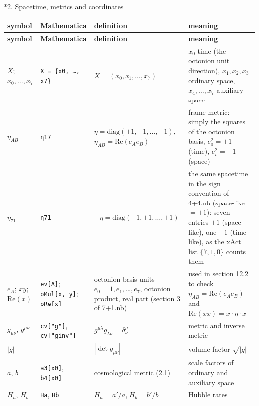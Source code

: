 \documentclass[10pt,a4paper]{article}
\makeatletter
\renewcommand\section{\@startsection{section}{1}{\z@}{-3.5ex \@plus -1ex \@minus -.2ex}{2.3ex \@plus.2ex}{\normalfont\Large\bfseries\raggedright}}
\makeatother
\begin{document}
\section*{2. Spacetime, metrics and coordinates}
{\small
\begin{longtable}{>{\raggedright\arraybackslash}p{}>{\raggedright\arraybackslash}p{}>{\raggedright\arraybackslash}p{}>{\raggedright\arraybackslash}p{}}
\toprule
\textbf{symbol} & \textbf{Mathematica} & \textbf{definition} & \textbf{meaning} \\
\midrule\endfirsthead
\toprule
\textbf{symbol} & \textbf{Mathematica} & \textbf{definition} & \textbf{meaning} \\
\midrule\endhead
\endfoot
\bottomrule\endlastfoot
$X$; $x_0,\dots,x_7$ & \texttt{X = \{x0, …, x7\}} & $X=(x_0,x_1,\dots,x_7)$ & $x_0$ time (the octonion unit direction), $x_1,x_2,x_3$ ordinary space, $x_4,\dots,x_7$ auxiliary space \\
$\eta_{AB}$ & \texttt{η17} & $\eta=\mathrm{diag}(+1,-1,\dots,-1)$, $\eta_{AB}=\mathrm{Re}(e_Ae_B)$ & frame metric: simply the squares of the octonion basis, $e_0^2=+1$ (time), $e_i^2=-1$ (space) \\
$\eta_{71}$ & \texttt{η71} & $-\eta=\mathrm{diag}(-1,+1,\dots,+1)$ & the same spacetime in the sign convention of 4+4.nb (space-like $=+1$): seven entries $+1$ (space-like), one $-1$ (time-like), as the xAct list $\{7,1,0\}$ counts them \\
$e_A$; $xy$; $\mathrm{Re}(x)$ & \texttt{ev[A]}; \texttt{oMul[x, y]}; \texttt{oRe[x]} & octonion basis units $e_0=1,e_1,\dots,e_7$, octonion product, real part (section 3 of 7+1.nb) & used in section 12.2 to check $\eta_{AB}=\mathrm{Re}(e_Ae_B)$ and $\mathrm{Re}(xx)=x\cdot\eta\cdot x$ \\
$g_{\mu\nu}$, $g^{\mu\nu}$ & \texttt{cv["g"]}, \texttt{cv["ginv"]} & $g^{\mu\lambda}g_{\lambda\nu}=\delta^\mu_\nu$ & metric and inverse metric \\
$|g|$ & — & $|\det g_{\mu\nu}|$ & volume factor $\sqrt{|g|}$ \\
$a$, $b$ & \texttt{a3[x0]}, \texttt{b4[x0]} & cosmological metric (2.1) & scale factors of ordinary and auxiliary space \\
$H_a$, $H_b$ & \texttt{Ha}, \texttt{Hb} & $H_a=a'/a$, $H_b=b'/b$ & Hubble rates \\

\end{longtable}}
\end{document}
